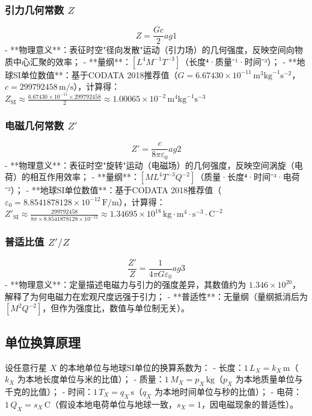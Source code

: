 \documentclass[a4paper, 12pt]{article}
\begin{document}
\subsubsection{引力几何常数 $Z$}
\begin{equation}
Z = \frac{Gc}{2} 	ag{1}
\end{equation}
- **物理意义**：表征时空"径向发散"运动（引力场）的几何强度，反映空间向物质中心汇聚的效率；
- **量纲**：$[L^4 M^{-1} T^{-3}]$（长度⁴·质量⁻¹·时间⁻³）；
- **地球SI单位数值**：基于CODATA 2018推荐值（$G = 6.67430 \times 10^{-11} \, \text{m}^3 \text{kg}^{-1} \text{s}^{-2}$，$c = 299792458 \, \text{m/s}$），计算得：
  $Z_{\text{SI}} \approx \frac{6.67430 \times 10^{-11} \times 299792458}{2} \approx 1.00065 \times 10^{-2} \, \text{m}^4 \text{kg}^{-1} \text{s}^{-3}$

\subsubsection{电磁几何常数 $Z'$}
\begin{equation}
Z' = \frac{c}{8\pi\varepsilon_0} 	ag{2}
\end{equation}
- **物理意义**：表征时空"旋转"运动（电磁场）的几何强度，反映空间涡旋（电荷）的相互作用效率；
- **量纲**：$[M L^4 T^{-3} Q^{-2}]$（质量·长度⁴·时间⁻³·电荷⁻²）；
- **地球SI单位数值**：基于CODATA 2018推荐值（$\varepsilon_0 = 8.8541878128 \times 10^{-12} \, \text{F/m}$），计算得：
  $Z'_{\text{SI}} \approx \frac{299792458}{8\pi \times 8.8541878128 \times 10^{-12}} \approx 1.34695 \times 10^{18} \, \text{kg} \cdot \text{m}^4 \cdot \text{s}^{-3} \cdot \text{C}^{-2}$

\subsubsection{普适比值 $Z'/Z$}
\begin{equation}
\frac{Z'}{Z} = \frac{1}{4\pi G\varepsilon_0} 	ag{3}
\end{equation}
- **物理意义**：定量描述电磁力与引力的强度差异，其数值约为 $1.346 \times 10^{20}$，解释了为何电磁力在宏观尺度远强于引力\cite{codata2018}；
- **普适性**：无量纲（量纲抵消后为 $[M^2 Q^{-2}]$，但作为强度比，数值与单位制无关）。

\subsection{单位换算原理}
设任意行星 $X$ 的本地单位与地球SI单位的换算系数为：
- 长度：$1 \, L_X = k_X \, \text{m}$（$k_X$ 为本地长度单位与米的比值）；
- 质量：$1 \, M_X = p_X \, \text{kg}$（$p_X$ 为本地质量单位与千克的比值）；
- 时间：$1 \, T_X = q_X \, \text{s}$（$q_X$ 为本地时间单位与秒的比值）；
- 电荷：$1 \, Q_X = s_X \, \text{C}$（假设本地电荷单位与地球一致，$s_X = 1$，因电磁现象的普适性）。
\end{document}
